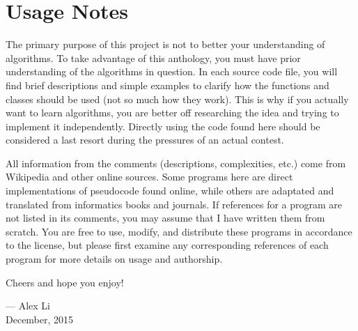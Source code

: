 \section{Usage Notes}

The primary purpose of this project is not to better your understanding of algorithms. To take advantage of this anthology, you must have prior understanding of the algorithms in question. In each source code file, you will find brief descriptions and simple examples to clarify how the functions and classes should be used (not so much how they work). This is why if you actually want to learn algorithms, you are better off researching the idea and trying to implement it independently. Directly using the code found here should be considered a last resort during the pressures of an actual contest.

All information from the comments (descriptions, complexities, etc.) come from Wikipedia and other online sources. Some programs here are direct implementations of pseudocode found online, while others are adaptated and translated from informatics books and journals. If references for a program are not listed in its comments, you may assume that I have written them from scratch. You are free to use, modify, and distribute these programs in accordance to the license, but please first examine any corresponding references of each program for more details on usage and authorship.

Cheers and hope you enjoy!

\begin{flushright}
--- Alex Li\\[0.3\baselineskip]
December, 2015
\end{flushright}

